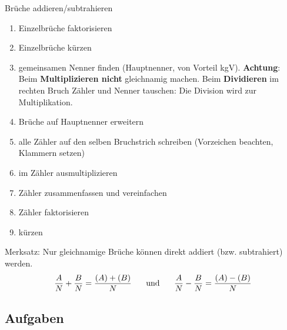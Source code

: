 
\begin{rezept}{Brüche addieren/subtrahieren}{}\label{bruchtermeRezept}
\begin{enumerate}
	\item Einzelbrüche faktorisieren
	\item Einzelbrüche kürzen
	\item gemeinsamen Nenner finden (Hauptnenner, von Vorteil
	kgV). \textbf{Achtung}: Beim \textbf{Multiplizieren nicht}
	gleichnamig machen. Beim \textbf{Dividieren} im rechten Bruch Zähler
	und Nenner tauschen: Die Division wird zur Multiplikation.
	\item Brüche auf Hauptnenner erweitern
	\item alle Zähler auf den selben Bruchstrich schreiben (Vorzeichen beachten, Klammern setzen)
	\item im Zähler ausmultiplizieren
	\item Zähler zusammenfassen und vereinfachen
	\item Zähler faktorisieren
	\item kürzen
\end{enumerate}
\end{rezept}


\begin{gesetz}{}{}
Merksatz: Nur gleichnamige Brüche können direkt addiert (bzw. subtrahiert)
werden.
$$\frac{A}{N} + \frac{B}{N} = \frac{(A)+(B)}{N} \hspace{5mm} \text{
und } \hspace{5mm} \frac{A}{N} - \frac{B}{N} = \frac{(A)-(B)}{N} $$
\end{gesetz}



\subsection*{Aufgaben}





